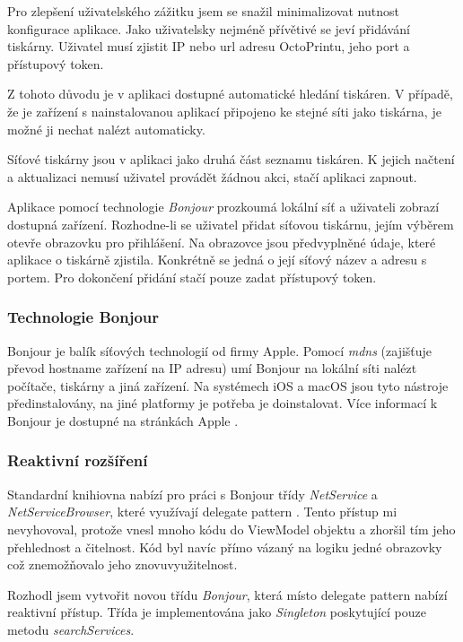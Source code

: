 Pro zlepšení uživatelského zážitku jsem se snažil minimalizovat nutnost konfigurace aplikace.
Jako uživatelsky nejméně přívětivé se jeví přidávání tiskárny.
Uživatel musí zjistit IP nebo \acrshort{url} adresu OctoPrintu, jeho port a přístupový token.

Z tohoto důvodu je v aplikaci dostupné automatické hledání tiskáren.
V případě, že je zařízení s nainstalovanou aplikací připojeno ke stejné síti jako tiskárna, je možné ji nechat nalézt automaticky.

Síťové tiskárny jsou v aplikaci jako druhá část seznamu tiskáren.
K jejich načtení a aktualizaci nemusí uživatel provádět žádnou akci, stačí aplikaci zapnout.

Aplikace pomocí technologie \textit{Bonjour} prozkoumá lokální síť a uživateli zobrazí dostupná zařízení.
Rozhodne-li se uživatel přidat síťovou tiskárnu, jejím výběrem otevře obrazovku pro přihlášení.
Na obrazovce jsou předvyplněné údaje, které aplikace o tiskárně zjistila.
Konkrétně se jedná o její síťový název a adresu s portem.
Pro dokončení přidání stačí pouze zadat přístupový token.

\subsubsection*{Technologie Bonjour}

Bonjour je balík síťových technologií od firmy Apple.
Pomocí \textit{\acrshort{mdns}} (zajišťuje převod hostname zařízení na IP adresu) umí Bonjour na lokální síti nalézt počítače, tiskárny a jiná zařízení.
Na systémech iOS a macOS jsou tyto nástroje předinstalovány, na jiné platformy je potřeba je doinstalovat.
Více informací k Bonjour je dostupné na stránkách Apple \cite{apple-bonjour}.

\subsubsection*{Reaktivní rozšíření}

Standardní knihiovna nabízí pro práci s Bonjour třídy \textit{NetService} a \textit{NetServiceBrowser}, které využívají delegate pattern \cite{apple-netservicebrowser}.
Tento přístup mi nevyhovoval, protože vnesl mnoho kódu do ViewModel objektu a zhoršil tím jeho přehlednost a čitelnost.
Kód byl navíc přímo vázaný na logiku jedné obrazovky což znemožňovalo jeho znovuvyužitelnost.

Rozhodl jsem vytvořit novou třídu \textit{Bonjour}, která místo delegate pattern nabízí reaktivní přístup.
Třída je implementována jako \textit{Singleton} \cite{thatthinginswift-singletons} poskytující pouze metodu \textit{searchServices}.

